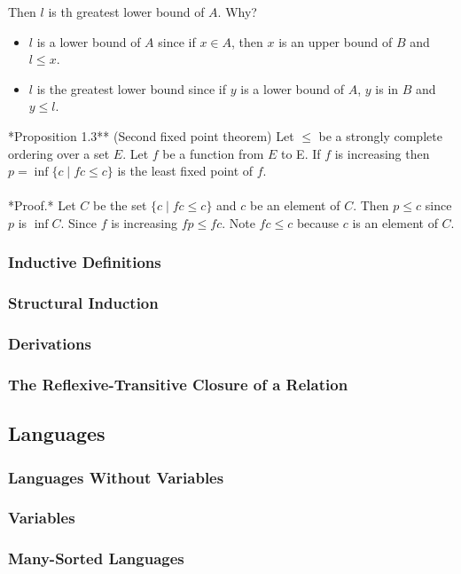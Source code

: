 Then $l$ is th greatest lower bound of $A$. Why?
\begin{itemize}
\item 
 $l$ is a lower bound of $A$ since if $x \in A$, then $x$ is an upper bound of $B$ and
 $l \leq x$.
\item $l$ is the greatest lower bound since if $y$ is a lower bound of $A$, 
$y$ is in $B$ and $y \leq l$.
\end{itemize}

\noindent **Proposition 1.3** (Second fixed point theorem) Let $\leq$ be a strongly
  complete ordering over a set $E$. Let $f$ be a function from $E$ to E. If
  $f$ is increasing then $p = \inf \{c \mid f c \leq c\}$ is the least fixed point
  of $f$.\\
\\
*Proof.* Let $C$ be the set $\{c \mid f c \leq c\}$ and $c$ be an element of $C$. Then
 $p \leq c$ since $p$ is $\inf C$. Since $f$ is increasing $f p \leq f c$. Note 
 $f c \leq c$ because $c$ is an element of $C$. 

\subsubsection{Inductive Definitions}
\subsubsection{Structural Induction}
\subsubsection{Derivations}
\subsubsection{The Reflexive-Transitive Closure of a Relation}


\subsection{Languages}

\subsubsection{Languages Without Variables}
\subsubsection{Variables}
\subsubsection{Many-Sorted Languages}
